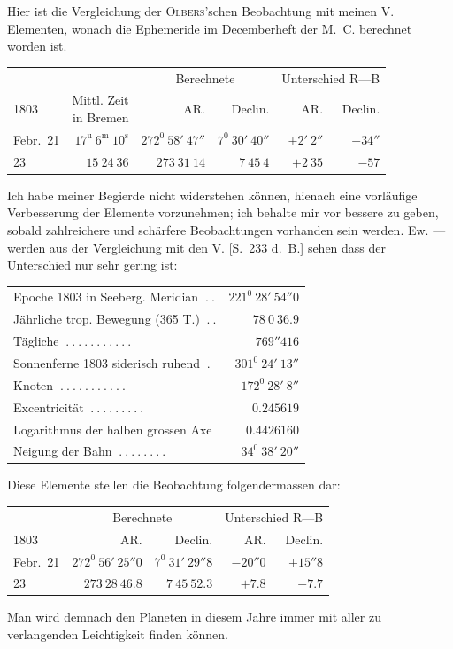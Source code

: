 Hier ist die Vergleichung der \textsc{Olbers}'schen Beobachtung mit meinen V. Elementen, wonach die Ephemeride im Decemberheft der M.\ C. berechnet worden ist.
\begin{center}
\begingroup\small\setlength{\tabcolsep}{3pt}
\begin{tabular}{l|r|r|r|r|r}
& &\multicolumn{2}{c|}{Berechnete}&\multicolumn{2}{c}{Unterschied R—B}\\
1803&\shortstack{Mittl. Zeit\\in Bremen}&AR.&Declin.&AR.&Declin.\\\hline
Febr.\ 21&$17^{\mathrm u}\ 6^{\mathrm m}\ 10^{\mathrm s}$&$272^0\ 58'\ 47''$&$7^0\ 30'\ 40''$&$+2'\ 2''$&$-34''$\\
23&$15\ 24\ 36$&$273\ 31\ 14$&$7\ 45\ 4$&$+2\ 35$&$-57$
\end{tabular}\endgroup
\end{center}

Ich habe meiner Begierde nicht widerstehen können, hienach eine vorläufige Verbesserung der Elemente vorzunehmen; ich behalte mir vor bessere zu geben, sobald zahlreichere und schärfere Beobachtungen vorhanden sein werden. Ew. — werden aus der Vergleichung mit den V. [S.\ 233 d.\ B.] sehen dass der Unterschied nur sehr gering ist:
%
\begin{center}
\begingroup\small\setlength{\tabcolsep}{3pt}
\begin{tabular}{l r}
Epoche 1803 in Seeberg. Meridian $\ .\ .$&$221^0\ 28'\ 54''0$\\
Jährliche trop. Bewegung (365 T.) $\ .\ .$&$78\ 0\ 36.9$\\
Tägliche $\ .\ .\ .\ .\ .\ .\ .\ .\ .\ .\ .$&$769''416$\\
Sonnenferne 1803 siderisch ruhend $\ .$&$301^0\ 24'\ 13''$\\[3pt]
Knoten $\ .\ .\ .\ .\ .\ .\ .\ .\ .\ .\ .$&$172^0\ 28'\ 8''$\\
Excentricität $\ .\ .\ .\ .\ .\ .\ .\ .\ .$&$0.245619$\\
Logarithmus der halben grossen Axe&$0.4426160$\\
Neigung der Bahn $\ .\ .\ .\ .\ .\ .\ .\ .$&$34^0\ 38'\ 20''$
\end{tabular}\endgroup
\end{center}

Diese Elemente stellen die Beobachtung folgendermassen dar:
\begin{center}
\begingroup\small\setlength{\tabcolsep}{4pt}
\begin{tabular}{l|r|r|r|r}
&\multicolumn{2}{c|}{Berechnete}&\multicolumn{2}{c}{Unterschied R—B}\\
1803&AR.&Declin.&AR.&Declin.\\\hline
Febr.\ 21&$272^0\ 56'\ 25''0$&$7^0\ 31'\ 29''8$&$-20''0$&$+15''8$\\
23&$273\ 28\ 46.8$&$7\ 45\ 52.3$&$+7.8$&$-7.7$
\end{tabular}\endgroup
\end{center}
Man wird demnach den Planeten in diesem Jahre immer mit aller zu verlangenden Leichtigkeit finden können.

